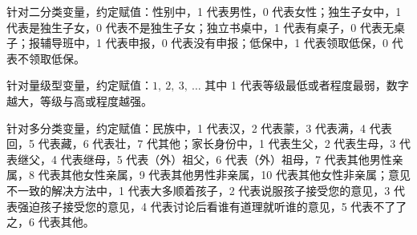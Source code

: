 \documentclass[zihao = -4, linespread = 1.5]{article}
\begin{document}
针对二分类变量，约定赋值：性别中，1 代表男性，0 代表女性；独生子女中，1 代表是独生子女，0 代表不是独生子女；独立书桌中，1 代表有桌子，0 代表无桌子；报辅导班中，1 代表申报，0 代表没有申报；低保中，1 代表领取低保，0 代表不领取低保。

针对量级型变量，约定赋值：$1,\ 2,\ 3,\ \ldots$ 其中 1 代表等级最低或者程度最弱，数字越大，等级与高或程度越强。

针对多分类变量，约定赋值：民族中，1 代表汉，2 代表蒙，3 代表满，4 代表回，5 代表藏，6 代表壮，7 代其他；家长身份中，1 代表生父，2 代表生母，3 代表继父，4 代表继母，5 代表（外）祖父，6 代表（外）祖母，7 代表其他男性亲属，8 代表其他女性亲属，9 代表其他男性非亲属，10 代表其他女性非亲属；意见不一致的解决方法中，1 代表大多顺着孩子，2 代表说服孩子接受您的意见，3 代表强迫孩子接受您的意见，4 代表讨论后看谁有道理就听谁的意见，5 代表不了了之，6 代表其他。
\end{document}
